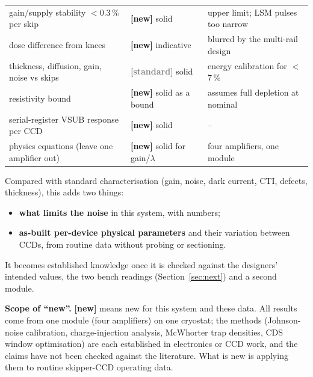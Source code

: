 \documentclass[11pt]{article}
\newcommand{\novel}{\textcolor{blue!60!black}{\textbf{[new]}}}
\newcommand{\std}{\textcolor{gray}{\textbf{[standard]}}}
\begin{document}
\begin{table}[H]
\begin{tabular}{p{6.2cm}p{2.2cm}p{6.6cm}}
gain/supply stability $<$0.3\,\% per skip & \novel{} solid & upper limit; LSM pulses too narrow\\
dose difference from knees & \novel{} indicative & blurred by the multi-rail design\\
thickness, diffusion, gain, noise vs skips & \std{} solid & energy calibration for $<$7\,\%\\
resistivity bound & \novel{} solid as a bound & assumes full depletion at nominal\\
serial-register VSUB response per CCD & \novel{} solid & --\\
physics equations (leave one amplifier out) & \novel{} solid for gain/$\lambda$ & four amplifiers, one module\\\bottomrule
\end{tabular}\end{table}
Compared with standard characterisation (gain, noise, dark current, CTI, defects, thickness), this adds two things:
\begin{itemize}
\item \textbf{what limits the noise} in this system, with numbers;
\item \textbf{as-built per-device physical parameters} and their variation between CCDs, from routine data without
  probing or sectioning.
\end{itemize}
It becomes established knowledge once it is checked against the designers' intended values, the two bench readings
(Section~\ref{sec:next}) and a second module.

\textbf{Scope of ``new''.} \novel{} means new for this system and these data. All results come from one module (four
amplifiers) on one cryostat; the methods (Johnson-noise calibration, charge-injection analysis, McWhorter trap
densities, CDS window optimisation) are each established in electronics or CCD work, and the claims have not been
checked against the literature. What is new is applying them to routine skipper-CCD operating data.

\end{document}
